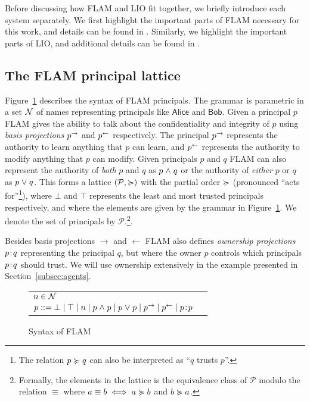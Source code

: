 Before discussing how FLAM and LIO fit together, we briefly introduce each system separately. We first highlight the important parts of FLAM necessary for this work, and details can be found in \cite{Arden:2015:FA:2859845.2859998}. Similarly, we highlight the important parts of LIO, and additional details can be found in \cite{SRMMlio}.

\subsection{The FLAM principal lattice}
Figure~\ref{fig:flam-syntax} describes the syntax of FLAM principals. The grammar is parametric in a set $\mathcal{N}$ of names representing principals like $\mathsf{Alice}$ and $\mathsf{Bob}$. Given a principal $p$ FLAM gives the ability to talk about the confidentiality and integrity of $p$ using \emph{basis projections} $p^{\rightarrow}$ and $p^{\leftarrow}$ respectively. The principal $p^{\rightarrow}$ represents the authority to learn anything that $p$ can learn, and $p^{\leftarrow}$ represents the authority to modify anything that $p$ can modify. Given principals $p$ and $q$ FLAM can also represent the authority of \emph{both} $p$ and $q$ as $p \mathrel{\land} q$ or the authority of \emph{either} $p$ or $q$ as $p \mathrel{\lor} q$. This forms a lattice $(\mathcal{P}, \succcurlyeq)$ with the partial order $\succcurlyeq$ (pronounced ``acts for''\footnote{The relation $p \succcurlyeq q$ can also be interpreted as ``$q$ trusts $p$''.}), where $\bot$ and $\top$ represents the least and most trusted principals respectively, and where the elements are given by the grammar in Figure~\ref{fig:flam-syntax}. We denote the set of principals by $\mathcal{P}$.\footnote{Formally, the elements in the lattice is the equivalence class of $\mathcal{P}$ modulo the relation $\equiv$ where $a \equiv b \iff a \succcurlyeq b$ and $b \succcurlyeq a$.}.

Besides basis projections $\rightarrow$ and $\leftarrow$ FLAM also defines \emph{ownership projections} $p\!:\!q$ representing the principal $q$, but where the owner $p$ controls which principals $p\!:\!q$ should trust. We will use ownership extensively in the example presented in Section~\ref{subsec:agents}.

\begin{figure}
    \centering
    \begin{tabular}{ll}
    $n \in \mathcal{N}$ \\
    $p ::= \bot \mid \top \mid n \mid p \mathrel{\land} p \mid p \mathrel{\lor} p \mid p^{\rightarrow} \mid p^{\leftarrow} \mid p\!:\!p$
    \end{tabular}
    \caption{Syntax of FLAM}
    \label{fig:flam-syntax}
\end{figure}



